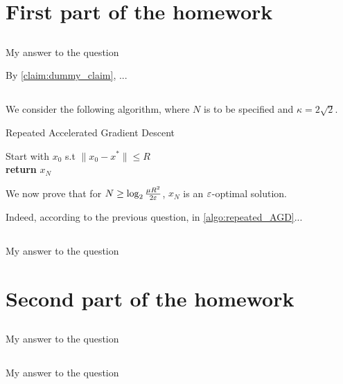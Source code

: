 \documentclass{article}
\numberwithin{equation}{subsection}
\begin{document}
\section*{First part of the homework}

\subsection{}
My answer to the question

By \autoref{claim:dummy_claim}, ...

\subsection{}
We consider the following algorithm, where $N$ is to be specified and $\kappa = 2 \sqrt{2}$.

\begin{algorithm}[H]
	\SetAlgoLined
	\caption{Repeated Accelerated Gradient Descent}\label{algo:repeated_AGD}
	Start with $x_0$ s.t $\|x_0 - x^*\| \leq R$ \\
	\textbf{return} $x_N$
\end{algorithm}

We now prove that for $N \geq \log_2 \frac{\mu R^2}{2 \varepsilon}$, $x_N$ is an $\varepsilon$-optimal solution.

Indeed, according to the previous question, in \autoref{algo:repeated_AGD}...

\subsection{}
My answer to the question



\section*{Second part of the homework}

\subsection{}
My answer to the question

\subsection{}
My answer to the question
\end{document}
